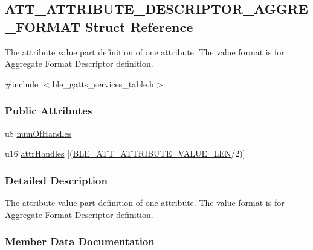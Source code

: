 \hypertarget{struct_a_t_t___a_t_t_r_i_b_u_t_e___d_e_s_c_r_i_p_t_o_r___a_g_g_r_e___f_o_r_m_a_t}{}\subsection{A\+T\+T\+\_\+\+A\+T\+T\+R\+I\+B\+U\+T\+E\+\_\+\+D\+E\+S\+C\+R\+I\+P\+T\+O\+R\+\_\+\+A\+G\+G\+R\+E\+\_\+\+F\+O\+R\+M\+AT Struct Reference}
\label{struct_a_t_t___a_t_t_r_i_b_u_t_e___d_e_s_c_r_i_p_t_o_r___a_g_g_r_e___f_o_r_m_a_t}


The attribute value part definition of one attribute. The value format is for Aggregate Format Descriptor definition.  




{\ttfamily \#include $<$ble\+\_\+gatts\+\_\+services\+\_\+table.\+h$>$}

\subsubsection*{Public Attributes}
\begin{DoxyCompactItemize}
\item 
u8 \hyperlink{struct_a_t_t___a_t_t_r_i_b_u_t_e___d_e_s_c_r_i_p_t_o_r___a_g_g_r_e___f_o_r_m_a_t_af0eb8804b57d2943509439293baad296}{num\+Of\+Handles}
\item 
u16 \hyperlink{struct_a_t_t___a_t_t_r_i_b_u_t_e___d_e_s_c_r_i_p_t_o_r___a_g_g_r_e___f_o_r_m_a_t_a96e02624f4f481ab3f7cf51551ce1213}{attr\+Handles} \mbox{[}(\hyperlink{group___b_l_e___g_a_t_t_ga4d1bd224084bd70c854891e4876dcf6f}{B\+L\+E\+\_\+\+A\+T\+T\+\_\+\+A\+T\+T\+R\+I\+B\+U\+T\+E\+\_\+\+V\+A\+L\+U\+E\+\_\+\+L\+EN}/2)\mbox{]}
\end{DoxyCompactItemize}


\subsubsection{Detailed Description}
The attribute value part definition of one attribute. The value format is for Aggregate Format Descriptor definition. 

\subsubsection{Member Data Documentation}
